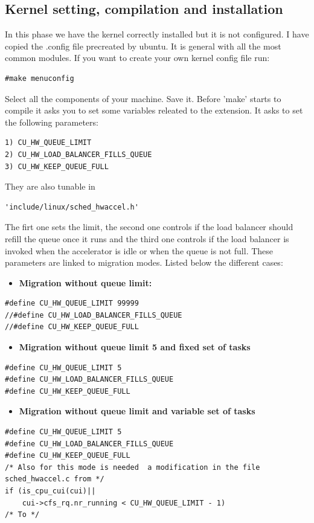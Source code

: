 \documentclass[a4paper,13pt]{article}
\begin{document}
\begin{multicols}{2}
\subsection{Kernel setting, compilation and installation}
    In this phase we have the kernel correctly installed but it is not configured. I have copied the
    .config file precreated by ubuntu. It is general with all the most common modules. If you want
    to create your own kernel config file run: 
\begin{lstlisting}
#make menuconfig 
\end{lstlisting}
    Select all the components of your machine. Save it.     Before 'make' starts to compile it asks you to set some variables releated to the extension.
    It asks to set the following parameters:
\begin{lstlisting}
1) CU_HW_QUEUE_LIMIT
2) CU_HW_LOAD_BALANCER_FILLS_QUEUE
3) CU_HW_KEEP_QUEUE_FULL
\end{lstlisting}
    They are also tunable in
\begin{lstlisting}
'include/linux/sched_hwaccel.h'
\end{lstlisting}
    The firt one sets the limit, the second one controls if the load balancer should refill the queue once 
    it runs and the third one controls if the load balancer is invoked when the accelerator is idle or when 
    the queue is not full. These parameters are linked to migration modes.
    Listed below the different cases:
    \begin{itemize}
        \item{ {\bf Migration without queue limit:\\}}
    \end{itemize}
\begin{lstlisting}
#define CU_HW_QUEUE_LIMIT 99999
//#define CU_HW_LOAD_BALANCER_FILLS_QUEUE
//#define CU_HW_KEEP_QUEUE_FULL
\end{lstlisting}
    \begin{itemize}
        \item{ {\bf Migration without queue limit 5 and fixed set of tasks\\}}
    \end{itemize}
\begin{lstlisting}
#define CU_HW_QUEUE_LIMIT 5
#define CU_HW_LOAD_BALANCER_FILLS_QUEUE
#define CU_HW_KEEP_QUEUE_FULL
\end{lstlisting}
    \begin{itemize}    
        \item{{\bf Migration without queue limit and variable set of tasks\\}} 
    \end{itemize}
\begin{lstlisting}
#define CU_HW_QUEUE_LIMIT 5
#define CU_HW_LOAD_BALANCER_FILLS_QUEUE
#define CU_HW_KEEP_QUEUE_FULL
/* Also for this mode is needed  a modification in the file sched_hwaccel.c from */ 
if (is_cpu_cui(cui)||
    cui->cfs_rq.nr_running < CU_HW_QUEUE_LIMIT - 1)
/* To */


\end{lstlisting}
\end{multicols}
\end{document}
